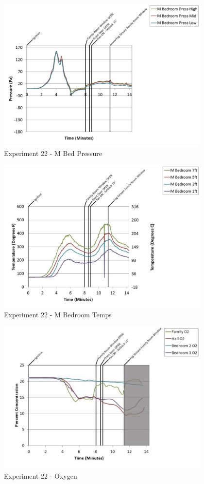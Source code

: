 \documentclass{article}
\begin{document}
\begin{appendices}
	\clearpage

	\begin{figure}[h!]
		\centering
		\includegraphics[height=3.05in]{0_Images/Results_Charts/Exp_22_Charts/MBedPressure.pdf}
		\caption{Experiment 22 - M Bed Pressure}
	\end{figure}
 

	\begin{figure}[h!]
		\centering
		\includegraphics[height=3.05in]{0_Images/Results_Charts/Exp_22_Charts/MBedroomTemps.pdf}
		\caption{Experiment 22 - M Bedroom Temps}
	\end{figure}
 
	\clearpage

	\begin{figure}[h!]
		\centering
		\includegraphics[height=3.05in]{0_Images/Results_Charts/Exp_22_Charts/Oxygen.pdf}
		\caption{Experiment 22 - Oxygen}
	\end{figure}
 


\end{appendices}
\end{document}
